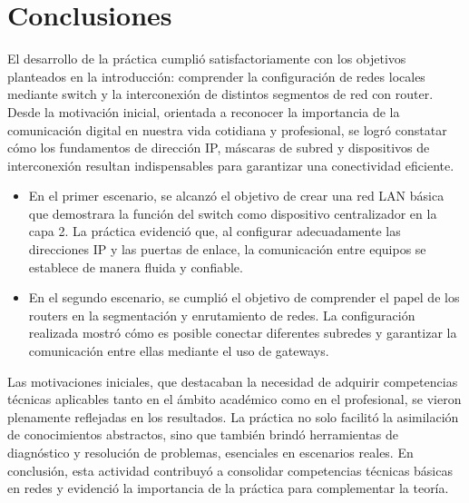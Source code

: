 \documentclass[letterpaper,12pt,oneside]{article}
\begin{document}
\clearpage

\section{Conclusiones}
El desarrollo de la práctica cumplió satisfactoriamente con los objetivos planteados en la introducción: comprender la configuración de redes locales mediante switch y la interconexión de distintos segmentos de red con router. Desde la motivación inicial, orientada a reconocer la importancia de la comunicación digital en nuestra vida cotidiana y profesional, se logró constatar cómo los fundamentos de dirección IP, máscaras de subred y dispositivos de interconexión resultan indispensables para garantizar una conectividad eficiente.
\begin{itemize}
    \item En el primer escenario, se alcanzó el objetivo de crear una red LAN básica que demostrara la función del switch como dispositivo centralizador en la capa 2. La práctica evidenció que, al configurar adecuadamente las direcciones IP y las puertas de enlace, la comunicación entre equipos se establece de manera fluida y confiable.
    \item En el segundo escenario, se cumplió el objetivo de comprender el papel de los routers en la segmentación y enrutamiento de redes. La configuración realizada mostró cómo es posible conectar diferentes subredes y garantizar la comunicación entre ellas mediante el uso de gateways.
\end{itemize}
Las motivaciones iniciales, que destacaban la necesidad de adquirir competencias técnicas aplicables tanto en el ámbito académico como en el profesional, se vieron plenamente reflejadas en los resultados. La práctica no solo facilitó la asimilación de conocimientos abstractos, sino que también brindó herramientas de diagnóstico y resolución de problemas, esenciales en escenarios reales. En conclusión, esta actividad contribuyó a consolidar competencias técnicas básicas en redes y evidenció la importancia de la práctica para complementar la teoría.
\clearpage
\end{document}
